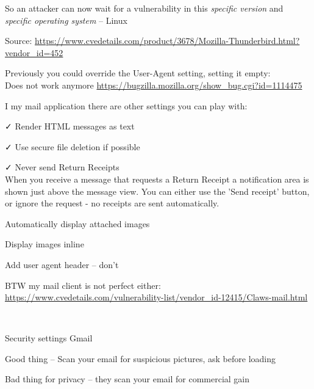 \documentclass[Screen16to9,17pt]{foils}
\begin{document}
So an attacker can now wait for a vulnerability in this \emph{specific version} and  \emph{specific operating system} -- Linux


Source: {\footnotesize\url{https://www.cvedetails.com/product/3678/Mozilla-Thunderbird.html?vendor_id=452}}



\begin{list2}
\item Previously you could override the User-Agent setting, setting it empty:\\
Does not work anymore
\url{https://bugzilla.mozilla.org/show_bug.cgi?id=1114475}
\end{list2}


I my mail application there are other settings you can play with:

\begin{list2}
\item[\faCheck] Render HTML messages as text
\item[\faCheck] Use secure file deletion if possible
\item[\faCheck] Never send Return Receipts\\
When you receive a message that requests a Return Receipt a notification area is shown just above the message view. You can either use the 'Send receipt' button, or ignore the request - no receipts are sent automatically.
\item[\faSquareO] Automatically display attached images
\item[\faSquareO] Display images inline
\item[\faSquareO] Add user agent header -- don't
\end{list2}

BTW my mail client is not perfect either:\\{\footnotesize
\url{https://www.cvedetails.com/vulnerability-list/vendor_id-12415/Claws-mail.html}}


{~}

\begin{list2}
\item Security settings Gmail
\item Good thing -- Scan your email for suspicious pictures, ask before loading
\item Bad thing for privacy -- they scan your email for commercial gain
\end{list2}
\end{document}
